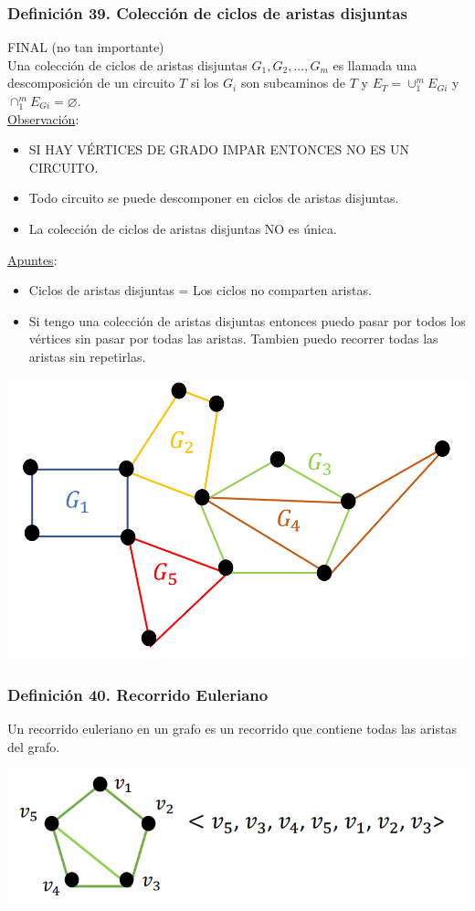 \documentclass{article}
\begin{document}
\subsubsection*{Definición 39. Colección de ciclos de aristas disjuntas} FINAL (no tan importante)
\\Una colección de ciclos de aristas disjuntas $G_1, G_2, ..., G_m$ es llamada una descomposición de un circuito $T$ si los $G_i$ son subcaminos
de $T$ y $E_T = \cup_1^m E_{Gi}$ y $\cap^m_1 E_{Gi} = \varnothing$.
\\\underline{Observación}:
\begin{itemize}
    \item SI HAY VÉRTICES DE GRADO IMPAR ENTONCES NO ES UN CIRCUITO.
    \item Todo circuito se puede descomponer en ciclos de aristas disjuntas.
    \item La colección de ciclos de aristas disjuntas NO es única.
\end{itemize}
\underline{Apuntes}: 
\begin{itemize}
    \item Ciclos de aristas disjuntas = Los ciclos no comparten aristas.
    \item Si tengo una colección de aristas disjuntas entonces puedo pasar por todos los vértices sin pasar por todas las aristas. Tambien puedo recorrer todas las aristas sin repetirlas.
\end{itemize} 
\begin{center}
    \includegraphics[width=.60\textwidth]{colCiclosAristasDisjuntas.PNG}
\end{center}
\nopagebreak[4]

\subsubsection*{Definición 40. Recorrido Euleriano}
Un recorrido euleriano en un grafo es un recorrido que contiene todas las aristas del grafo.
\begin{center}
    \includegraphics[width=.60\textwidth]{recorridoEuleriano.PNG}
\end{center}
\end{document}
